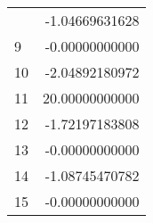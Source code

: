 \begin{table}[H]
\begin{tabular}{lr}
               &
            
        
            -1.04669631628
            
        
        \\
    
        
            9
             
               &
            
        
            -0.00000000000
            
        
        \\
    
        
            10
             
               &
            
        
            -2.04892180972
            
        
        \\
    
        
            11
             
               &
            
        
            20.00000000000
            
        
        \\
    
        
            12
             
               &
            
        
            -1.72197183808
            
        
        \\
    
        
            13
             
               &
            
        
            -0.00000000000
            
        
        \\
    
        
            14
             
               &
            
        
            -1.08745470782
            
        
        \\
    
        
            15
             
               &
            
        
            -0.00000000000
            
        
        \\
    

\end{tabular}
\end{table}
